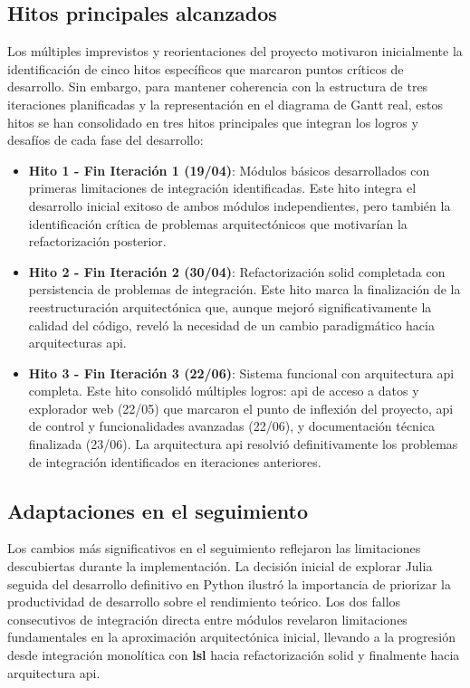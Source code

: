 \subsection{Hitos principales alcanzados}
\label{subsec:hitos_principales}

Los múltiples imprevistos y reorientaciones del proyecto motivaron inicialmente la identificación de cinco hitos específicos que marcaron puntos críticos de desarrollo. Sin embargo, para mantener coherencia con la estructura de tres iteraciones planificadas y la representación en el diagrama de Gantt real, estos hitos se han consolidado en tres hitos principales que integran los logros y desafíos de cada fase del desarrollo:

\begin{itemize}
    \item \textbf{Hito 1 - Fin Iteración 1 (19/04)}: Módulos básicos desarrollados con primeras limitaciones de integración identificadas. Este hito integra el desarrollo inicial exitoso de ambos módulos independientes, pero también la identificación crítica de problemas arquitectónicos que motivarían la refactorización posterior.
    
    \item \textbf{Hito 2 - Fin Iteración 2 (30/04)}: Refactorización \acrshort{solid} completada con persistencia de problemas de integración. Este hito marca la finalización de la reestructuración arquitectónica que, aunque mejoró significativamente la calidad del código, reveló la necesidad de un cambio paradigmático hacia arquitecturas \acrshort{api}.
    
    \item \textbf{Hito 3 - Fin Iteración 3 (22/06)}: Sistema funcional con arquitectura \acrshort{api} completa. Este hito consolidó múltiples logros: \acrshort{api} de acceso a datos y explorador web (22/05) que marcaron el punto de inflexión del proyecto, \acrshort{api} de control y funcionalidades avanzadas (22/06), y documentación técnica finalizada (23/06). La arquitectura \acrshort{api} resolvió definitivamente los problemas de integración identificados en iteraciones anteriores.
\end{itemize}

\subsection{Adaptaciones en el seguimiento}
\label{subsec:adaptaciones_seguimiento}

Los cambios más significativos en el seguimiento reflejaron las limitaciones descubiertas durante la implementación. La decisión inicial de explorar Julia seguida del desarrollo definitivo en Python ilustró la importancia de priorizar la productividad de desarrollo sobre el rendimiento teórico. Los dos fallos consecutivos de integración directa entre módulos revelaron limitaciones fundamentales en la aproximación arquitectónica inicial, llevando a la progresión desde integración monolítica con \textbf{\acrshort{lsl}} hacia refactorización \acrshort{solid} y finalmente hacia arquitectura \acrshort{api}.

